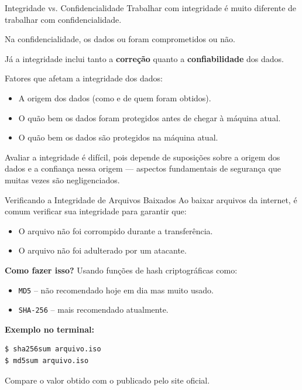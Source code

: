 \begin{frame}{Integridade vs. Confidencialidade}
    Trabalhar com integridade é muito diferente de trabalhar com confidencialidade.

    \vspace{0.3cm}
    Na confidencialidade, os dados ou foram comprometidos ou não.

    \vspace{0.3cm}
    Já a integridade inclui tanto a \textbf{correção} quanto a \textbf{confiabilidade} dos dados.

    \vspace{0.3cm}
    Fatores que afetam a integridade dos dados:
    \begin{itemize}
        \item A origem dos dados (como e de quem foram obtidos).
        \item O quão bem os dados foram protegidos antes de chegar à máquina atual.
        \item O quão bem os dados são protegidos na máquina atual.
    \end{itemize}

    \vspace{0.3cm}
    Avaliar a integridade é difícil, pois depende de suposições sobre a origem dos dados e a confiança nessa origem — aspectos fundamentais de segurança que muitas vezes são negligenciados.
\end{frame}
\begin{frame}[fragile]{Verificando a Integridade de Arquivos Baixados}
    Ao baixar arquivos da internet, é comum verificar sua integridade para garantir que:

    \begin{itemize}
        \item O arquivo não foi corrompido durante a transferência.
        \item O arquivo não foi adulterado por um atacante.
    \end{itemize}

    \vspace{0.3cm}
    \textbf{Como fazer isso?} Usando funções de hash criptográficas como:

    \begin{itemize}
        \item \texttt{MD5} -- não recomendado hoje em dia mas muito usado.
        \item \texttt{SHA-256} -- mais  recomendado atualmente.
    \end{itemize}

    \vspace{0.3cm}
    \textbf{Exemplo no terminal:}

    \begin{verbatim}
$ sha256sum arquivo.iso
$ md5sum arquivo.iso
\end{verbatim}

    Compare o valor obtido com o publicado pelo site oficial.
\end{frame}


